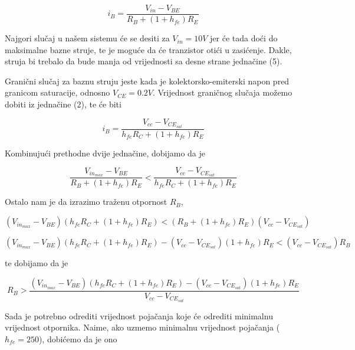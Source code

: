 \documentclass{article}
\begin{document}
        \begin{equation}
            i_B = \frac{V_{in}-V_{BE}}{R_B + (1 + h_{fe})R_E}
        \end{equation}

        Najgori slučaj u našem sistemu će se desiti za $V_{in} = 10V$ jer će tada
        doći do maksimalne bazne struje, te je moguće da će tranzistor otići u zasićenje. Dakle,
        struja bi trebalo da bude manja od vrijednosti sa desne strane jednačine (5).

        Granični slučaj za baznu struju jeste kada je kolektorsko-emiterski napon pred granicom
        saturacije, odnosno $V_{CE} = 0.2V$.
        Vrijednost graničnog slučaja možemo dobiti iz jednačine (2), te će biti

        \begin{equation}
            i_B = \frac{V_{cc}-V_{CE_{sat}}}{h_{fe}R_C + (1 + h_{fe})R_E}
        \end{equation}

        Kombinujući prethodne dvije jednačine, dobijamo da je

        \begin{equation}
            \frac{V_{in_{max}}-V_{BE}}{R_B + (1 + h_{fe})R_E} < \frac{V_{cc}-V_{CE_{sat}}}{h_{fe}R_C + (1 + h_{fe})R_E}
        \end{equation}

        Ostalo nam je da izrazimo traženu otpornost $R_B$,

        \begin{equation}
            (V_{in_{max}}-V_{BE})(h_{fe}R_C + (1 + h_{fe})R_E) < (R_B + (1 + h_{fe})R_E)(V_{cc}-V_{CE_{sat}})
        \end{equation}

        \begin{equation}
            (V_{in_{max}}-V_{BE})(h_{fe}R_C + (1 + h_{fe})R_E) - (V_{cc}-V_{CE_{sat}})(1 + h_{fe})R_E < (V_{cc}-V_{CE_{sat}})R_B
        \end{equation}

        te dobijamo da je 

        \begin{equation}
            R_B > \frac{(V_{in_{max}}-V_{BE})(h_{fe}R_C + (1 + h_{fe})R_E) - (V_{cc}-V_{CE_{sat}})(1 + h_{fe})R_E}{V_{cc}-V_{CE_{sat}}}
        \end{equation}

        Sada je potrebno odrediti vrijednost pojačanja koje će odrediti minimalnu vrijednost otpornika.
        Naime, ako uzmemo minimalnu vrijednost pojačanja ($h_{fe} = 250$), dobićemo da je ono
\end{document}
